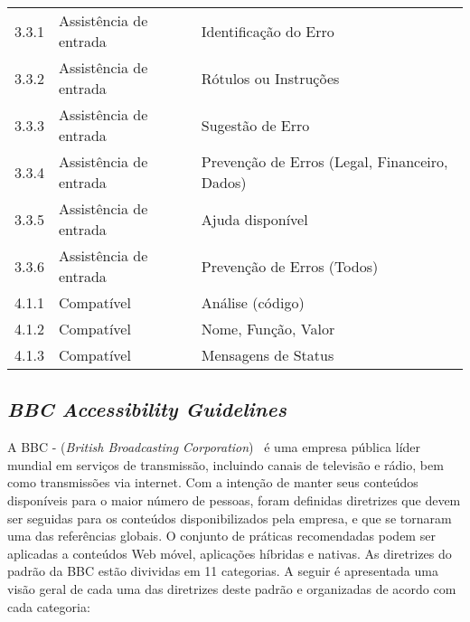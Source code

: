 \begin{table}[]
\begin{tabular}{lll}
 3.3.1           & Assistência de entrada & Identificação do Erro                                                                \\
 
 3.3.2           & Assistência de entrada & Rótulos ou Instruções                                                                \\
 
 3.3.3           & Assistência de entrada & Sugestão de Erro                                                                    \\
 
 3.3.4           & Assistência de entrada & Prevenção de Erros (Legal, Financeiro, Dados)                                       \\
 
 3.3.5           & Assistência de entrada & Ajuda disponível                                                                    \\
 
 3.3.6           & Assistência de entrada & Prevenção de Erros (Todos)                                                          \\
 \hline
\hline
4.1.1           & Compatível             & Análise (código)                                                                     \\
 
4.1.2           & Compatível             & Nome, Função, Valor                                                                  \\
 
4.1.3           & Compatível             & Mensagens de Status           \\                                                     
\hline
\end{tabular}
\end{table}



\subsection{\textit{BBC Accessibility Guidelines}}

A BBC - (\textit{British Broadcasting Corporation})~\cite{bbc} é uma empresa pública líder mundial em serviços de transmissão, incluindo canais de televisão e rádio, bem como transmissões via internet. 
Com a intenção de manter seus conteúdos disponíveis para o maior número de pessoas, foram definidas diretrizes que devem ser seguidas para os conteúdos disponibilizados pela empresa, e que se tornaram uma das referências globais. O conjunto de práticas recomendadas podem ser aplicadas a conteúdos Web móvel, aplicações híbridas e nativas. As diretrizes do padrão da BBC estão divividas em 11 categorias. A seguir é apresentada uma visão geral de cada uma das diretrizes deste padrão e organizadas de acordo com cada categoria:


